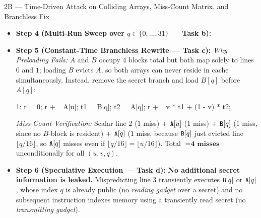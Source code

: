 \begin{templatebox}{2B --- Time-Driven Attack on Colliding Arrays, Miss-Count Matrix, and Branchless Fix}
\begin{itemize}
\begin{compactitem}
\[\begin{cases}
      \end{cases}
    \]
  \end{compactitem}
  \item \textbf{Step 4 (Multi-Run Sweep over $q \in \{0,\dots,31\}$ --- Task b):}
  \item \textbf{Step 5 (Constant-Time Branchless Rewrite --- Task c):}
  \emph{Why Preloading Fails:} $A$ and $B$ occupy 4 blocks total but both map solely to lines $0$ and $1$; loading $B$ evicts $A$, so both arrays can never reside in cache simultaneously. Instead, remove the secret branch and load $B[q]$ before $A[q]$:
  \begin{codeblock}
1: r = 0; \; r += A[u]; \; t1 = B[q]; \; t2 = A[q]; \; r += v * t1 + (1 - v) * t2;
  \end{codeblock}
  \emph{Miss-Count Verification:} Scalar line 2 ($1$ miss) $+$ $\texttt{A}[u]$ ($1$ miss) $+$ $\texttt{B}[q]$ ($1$ miss, since no $B$-block is resident) $+$ $\texttt{A}[q]$ ($1$ miss, because $\texttt{B}[q]$ just evicted line $\lfloor q/16 \rfloor$, so $\texttt{A}[q]$ misses even if $\lfloor q/16 \rfloor = \lfloor u/16 \rfloor$). Total $= \textbf{4 misses}$ unconditionally for all $(u, v, q)$.
  \item \textbf{Step 6 (Speculative Execution --- Task d):}
  \textbf{No additional secret information is leaked.} Mispredicting line 3 transiently executes $\texttt{B}[q]$ or $\texttt{A}[q]$, whose index $q$ is already public (no \emph{reading gadget} over a secret) and no subsequent instruction indexes memory using a transiently read secret (no \emph{transmitting gadget}).
\end{itemize}
\end{templatebox}

